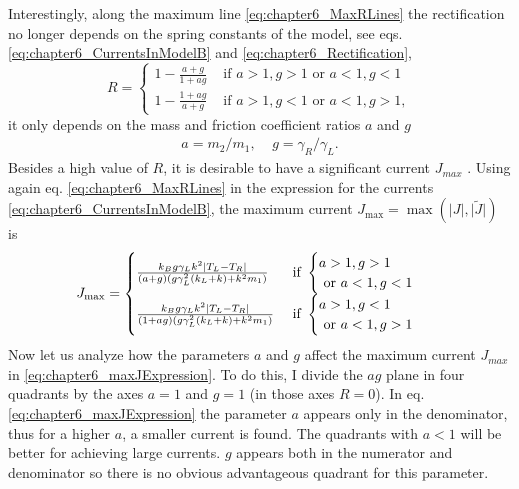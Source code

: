 Interestingly, along the maximum line  \eqref{eq:chapter6_MaxRLines} the rectification no longer depends on the spring constants of the model,
see  eqs. \eqref{eq:chapter6_CurrentsInModelB}  and \eqref{eq:chapter6_Rectification},
%
\begin{equation}
    R=
    \begin{cases}
      1-\frac{a+g}{1+ag} &\text{ if }a>1,g>1\text{ or }a<1,g<1\\
      1-\frac{1+ag}{a+g} &\text{ if }a>1,g<1\text{ or }a<1,g>1,
    \end{cases}
  \label{eq:chapter6_maxRExpression}
\end{equation}
%
it only depends on the mass and friction coefficient ratios $a$ and $g$
%
\begin{align}
  a = m_2/m_1,\;\;\;\;
  g = \gamma_R/\gamma_L.
\end{align}
%
Besides a high value of $R$, it is desirable to have a significant current $J_{max}$
\cite{Simon2019}. Using again  eq. \eqref{eq:chapter6_MaxRLines} in the expression for the currents \eqref{eq:chapter6_CurrentsInModelB}, the maximum current $J_{\max} = \max(\big|{J}\big|,\big|\tilde{J}\big|)$ is
%
\begin{align}
    &J_{\max}=\begin{cases}
   \frac{k_B g\gamma_L k^2 \abs{T_L-T_R}}{(a+g)(g\gamma_L^2(k_L+k)+k^2m_1)} &
   \text{ if }\begin{cases}a>1,g>1\\
   \text{ or }a<1,g<1\end{cases}
    \\
    \frac{k_B g\gamma_L k^2 \abs{T_L-T_R}}{(1+ag)(g\gamma_L^2(k_L+k)+k^2m_1)}&\text{ if }
    \begin{cases}a>1,g<1
    \\\text{ or }a<1,g>1\end{cases}
    \end{cases}
    \label{eq:chapter6_maxJExpression}
\end{align}
%
Now let us analyze how the parameters $a$ and $g$ affect the maximum current $J_{max}$ in \eqref{eq:chapter6_maxJExpression}. To do this, I divide the $ag$ plane in four quadrants by the axes $a = 1$ and $g = 1$ (in those axes $R = 0$). In eq. \eqref{eq:chapter6_maxJExpression} the parameter $a$ appears only in the denominator, thus for a higher $a$, a smaller current is found. The quadrants with $a < 1$ will be better for achieving large currents. $g$ appears both in the numerator and denominator so there is no obvious advantageous quadrant for this parameter.

